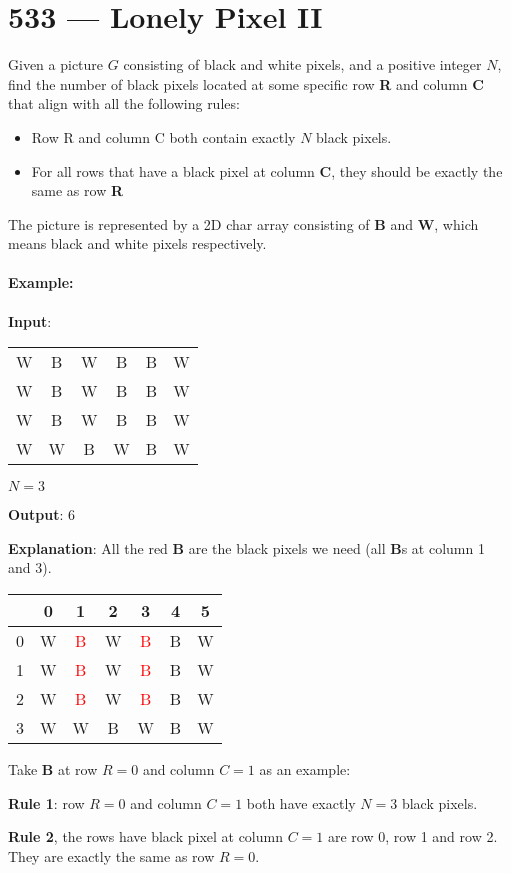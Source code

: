 \section{533 --- Lonely Pixel II}
Given a picture $G$ consisting of black and white pixels, and a positive integer $N$, find the number of black pixels located at some specific row \textbf{R} and column \textbf{C} that align with all the following rules:

\begin{itemize}
\item Row R and column C both contain exactly $ N $ black pixels.
\item For all rows that have a black pixel at column \textbf{C}, they should be exactly the same as row \textbf{R}
\end{itemize}

The picture is represented by a 2D char array consisting of \textbf{B} and \textbf{W}, which means black and white pixels respectively.

\paragraph{Example:}

\begin{flushleft}
\textbf{Input}: 
                                           
\begin{table}[H]
\begin{tabular}{cccccc}
W & B & W & B & B & W \\   
W & B & W & B & B & W \\
W & B & W & B & B & W \\
W & W & B & W & B & W
\end{tabular}
\end{table}

$ N = 3 $

\textbf{Output}: 6

\textbf{Explanation}: All the red \textbf{B} are the black pixels we need (all \textbf{B}s at column 1 and 3).

\begin{table}[H]
\begin{tabular}{l|cccccc}
 & 0 &   1&    2 &   3 &   4 &   5 \\
\hline
0 &   W & \textcolor{red}{B} & W & \textcolor{red}{B} & B & W \\    
1  &   W & \textcolor{red}{B} & W & \textcolor{red}{B} & B & W \\    
2  &   W & \textcolor{red}{B} & W & \textcolor{red}{B} & B & W \\    
3  &   W & W & B & W & B & W 
\end{tabular}
\end{table}  

Take \textbf{B} at row $ R = 0 $ and column $ C = 1 $ as an example:

\textbf{Rule 1}: row $ R = 0 $ and column $ C = 1 $ both have exactly $ N = 3 $ black pixels. 

\textbf{Rule 2}, the rows have black pixel at column $ C = 1 $ are row 0, row 1 and row 2. They are exactly the same as row $ R = 0 $.
\end{flushleft}

